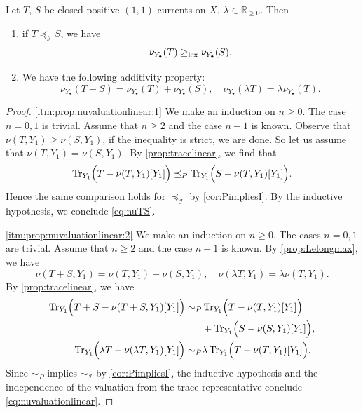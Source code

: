 \begin{proposition}\label{prop:nuvaluationlinear}
    Let $T$, $S$ be closed positive $(1,1)$-currents on $X$, $\lambda\in \mathbb{R}_{\geq 0}$. Then
    \begin{enumerate}
     \item\label{itm:prop:nuvaluationlinear:1} if $T\preceq_{\mathcal{I}} S$, we have
        \begin{equation}\label{eq:nuTS}
            \nu_{Y_{\bullet}}(T)\geq_{\mathrm{lex}}\nu_{Y_{\bullet}}(S).
        \end{equation}
        \item\label{itm:prop:nuvaluationlinear:2} We have the following additivity property:
        \begin{equation}\label{eq:nuvaluationlinear}
            \nu_{Y_{\bullet}}(T+S)=\nu_{Y_{\bullet}}(T)+\nu_{Y_{\bullet}}(S),\quad \nu_{Y_{\bullet}}(\lambda T)=\lambda \nu_{Y_{\bullet}}(T).
        \end{equation}
    \end{enumerate}
\end{proposition}
\begin{proof}
\ref{itm:prop:nuvaluationlinear:1} We make an induction on $n\geq 0$. The case $n=0,1$ is trivial. Assume that $n\geq 2$ and the case $n-1$ is known. Observe that $\nu(T,Y_1)\geq \nu(S,Y_1)$, if the inequality is strict, we are done. So let us assume that $\nu(T,Y_1)=\nu(S,Y_1)$. By \cref{prop:tracelinear}, we find that
    \[
    \operatorname{Tr}_{Y_1}\Bigl(T-\nu(T,Y_1)[Y_1]\Bigr)\preceq_P\operatorname{Tr}_{Y_1}\Bigl(S-\nu(T,Y_1)[Y_1]\Bigr).
    \]
    Hence the same comparison holds for $\preceq_{\mathcal{I}}$ by \cref{cor:PimpliesI}.
    By the inductive hypothesis, we conclude \eqref{eq:nuTS}.

\ref{itm:prop:nuvaluationlinear:2} We make an induction on $n\geq 0$. The cases $n=0,1$ are trivial. Assume that $n\geq 2$ and the case $n-1$ is known. By \cref{prop:Lelongmax}, we have
    \[
    \nu(T+S,Y_1)=\nu(T,Y_1)+\nu(S,Y_1),\quad \nu(\lambda T,Y_1)=\lambda\nu(T,Y_1).
    \]
    By \cref{prop:tracelinear}, we have
    \[
    \begin{split}
    \operatorname{Tr}_{Y_1}\Bigl(T+S-\nu(T+S,Y_1)[Y_1]\Bigr)\sim_P&\operatorname{Tr}_{Y_1}\Bigl(T-\nu(T,Y_1)[Y_1]\Bigr)\\
    &+\operatorname{Tr}_{Y_1}\Bigl(S-\nu(S,Y_1)[Y_1]\Bigr),\\
    \operatorname{Tr}_{Y_1}\Bigl(\lambda T-\nu(\lambda T,Y_1)[Y_1]\Bigr)\sim_P& \lambda \operatorname{Tr}_{Y_1}\Bigl(T-\nu(T,Y_1)[Y_1]\Bigr).
    \end{split}
    \]
    Since $\sim_P$ implies $\sim_{\mathcal{I}}$ by \cref{cor:PimpliesI}, the inductive hypothesis and the independence of the valuation from the trace representative conclude \eqref{eq:nuvaluationlinear}.

\end{proof}

